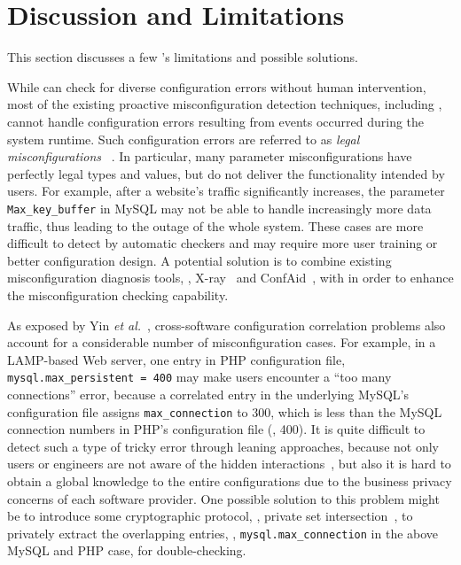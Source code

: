 
\section{Discussion and Limitations}

This section discusses a few \app's limitations
and possible solutions.

While \app can check for diverse configuration errors without
human intervention, most of the existing proactive 
misconfiguration detection techniques,
including \app, cannot handle configuration errors
resulting from events occurred during the system runtime.
Such configuration errors are referred to as {\em legal misconfigurations}%
~\cite{yin11anempirical}. In particular, 
many parameter misconfigurations have 
perfectly legal types and values, 
but do not deliver the functionality intended by users. 
For example, after a website's traffic significantly increases,
the parameter {\tt Max\_key\_buffer} in MySQL may not 
be able to handle increasingly more data traffic,
thus leading to the outage of the whole system.
These cases are more difficult to detect by
automatic checkers and may require more user training or
better configuration design.
A potential solution is to combine existing misconfiguration diagnosis
tools, \eg, X-ray~\cite{attariyan12x-ray} 
and ConfAid~\cite{attariyan10automating},
with \app in order to enhance the 
misconfiguration checking capability.

As exposed by Yin {\em et al.}~\cite{yin11anempirical},
cross-software configuration correlation problems also account
for a considerable number of misconfiguration cases.
For example, in a LAMP-based Web server, one entry in 
PHP configuration file, {\tt mysql.max\_persistent = 400}
may make users encounter a ``too many connections'' error,
because a correlated entry in the underlying MySQL's configuration
file assigns {\tt max\_connection} to 300, which is less
than the MySQL connection numbers in PHP's configuration file (\ie, 400).
It is quite difficult to detect such a type of tricky error
through leaning approaches, because not only users or engineers 
are not aware of the hidden interactions~\cite{xu15systems},
but also it is hard to obtain a global knowledge to the entire
configurations due to the business privacy concerns of
each software provider.
One possible solution to this problem might be to introduce
some cryptographic protocol, \eg, private set
intersection~\cite{kissner05privacy}, to privately extract the
overlapping entries, \eg, {\tt mysql.max\_connection} in the 
above MySQL and PHP case, for double-checking.

